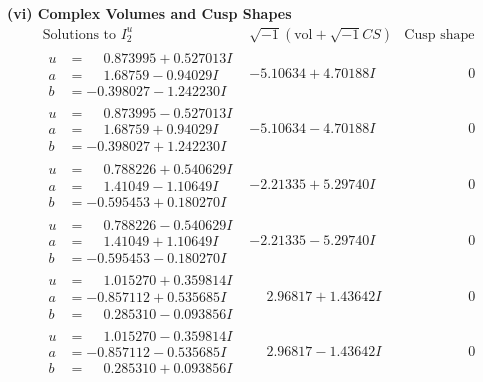 \documentclass[1p]{elsarticle_modified}
\theoremstyle{definition}
\newcommand{\I}{\sqrt{-1}}
\begin{document}
\newpage\flushleft \textbf{(vi) Complex Volumes and Cusp Shapes}
$$\begin{array}{c|c|c}  
\text{Solutions to }I^u_{2}& \I (\text{vol} + \sqrt{-1}CS) & \text{Cusp shape}\\
 \hline 
\begin{aligned}
u &= \phantom{-}0.873995 + 0.527013 I \\
a &= \phantom{-}1.68759 - 0.94029 I \\
b &= -0.398027 - 1.242230 I\end{aligned}
 & -5.10634 + 4.70188 I & \phantom{-0.000000 } 0 \\ \hline\begin{aligned}
u &= \phantom{-}0.873995 - 0.527013 I \\
a &= \phantom{-}1.68759 + 0.94029 I \\
b &= -0.398027 + 1.242230 I\end{aligned}
 & -5.10634 - 4.70188 I & \phantom{-0.000000 } 0 \\ \hline\begin{aligned}
u &= \phantom{-}0.788226 + 0.540629 I \\
a &= \phantom{-}1.41049 - 1.10649 I \\
b &= -0.595453 + 0.180270 I\end{aligned}
 & -2.21335 + 5.29740 I & \phantom{-0.000000 } 0 \\ \hline\begin{aligned}
u &= \phantom{-}0.788226 - 0.540629 I \\
a &= \phantom{-}1.41049 + 1.10649 I \\
b &= -0.595453 - 0.180270 I\end{aligned}
 & -2.21335 - 5.29740 I & \phantom{-0.000000 } 0 \\ \hline\begin{aligned}
u &= \phantom{-}1.015270 + 0.359814 I \\
a &= -0.857112 + 0.535685 I \\
b &= \phantom{-}0.285310 - 0.093856 I\end{aligned}
 & \phantom{-}2.96817 + 1.43642 I & \phantom{-0.000000 } 0 \\ \hline\begin{aligned}
u &= \phantom{-}1.015270 - 0.359814 I \\
a &= -0.857112 - 0.535685 I \\
b &= \phantom{-}0.285310 + 0.093856 I\end{aligned}
 & \phantom{-}2.96817 - 1.43642 I & \phantom{-0.000000 } 0 \\ \hline\begin{aligned}

\end{aligned}
\end{array}$$
\end{document}
